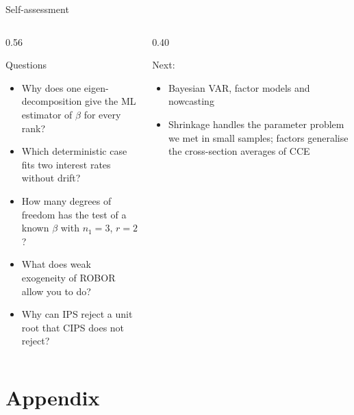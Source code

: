 \begin{frame}{Self-assessment}
\itemsize{\small}
\begin{columns}[T]
\begin{column}{0.56\textwidth}
\begin{block}{Questions}
\begin{itemize}
    \item Why does one eigen-decomposition give the ML estimator of $\beta$ for every rank?
    \item Which deterministic case fits two interest rates without drift?
    \item How many degrees of freedom has the test of a known $\beta$ with $n_1 = 3$, $r = 2$?
    \item What does weak exogeneity of ROBOR allow you to do?
    \item Why can IPS reject a unit root that CIPS does not reject?
\end{itemize}
\end{block}
\end{column}
\begin{column}{0.40\textwidth}
\begin{block}{Next: }
\begin{itemize}
    \item Bayesian VAR, factor models and nowcasting
    \item Shrinkage handles the parameter problem we met in small samples; factors generalise the cross-section averages of CCE
\end{itemize}
\end{block}
\end{column}
\end{columns}
\end{frame}


\section{Appendix}

